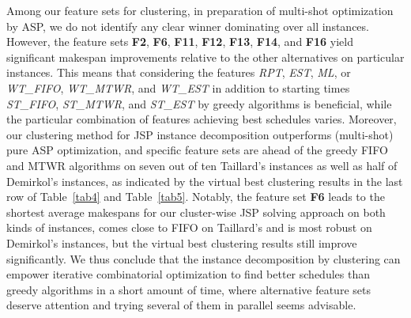 \documentclass[runningheads]{llncs}
\newcommand{\stest}{\textit{ST\_EST}\xspace}
\newcommand{\stmtwr}{\textit{ST\_MTWR}\xspace}
\newcommand{\stfifo}{\textit{ST\_FIFO}\xspace}
\newcommand{\wtest}{\textit{WT\_EST}\xspace}
\newcommand{\wtmtwr}{\textit{WT\_MTWR}\xspace}
\newcommand{\wtfifo}{\textit{WT\_FIFO}\xspace}
\begin{document}
Among our feature sets for clustering, in preparation of multi-shot optimization by ASP,
we do not identify any clear winner dominating over all instances.
However, the feature sets \textbf{F2}, \textbf{F6}, \textbf{F11}, \textbf{F12}, \textbf{F13}, \textbf{F14}, and \textbf{F16}
yield significant makespan improvements relative to the other alternatives on particular instances.
This means that considering the features \textit{RPT}, \textit{EST}, \textit{ML}, or
\wtfifo, \wtmtwr, and \wtest in addition to starting times \stfifo, \stmtwr, and \stest by
greedy algorithms is beneficial, while the particular combination of features achieving best schedules varies.
Moreover, our clustering method for JSP instance decomposition outperforms (multi-shot) pure ASP optimization,
and specific feature sets are ahead of the greedy FIFO and MTWR algorithms on seven out of ten Taillard's instances as well as half of Demirkol's instances,
as indicated by the virtual best clustering results in the last row of Table~\ref{tab4}
and Table~\ref{tab5}.
Notably, the feature set \textbf{F6} leads to the shortest average makespans for
our cluster-wise JSP solving approach on both kinds of instances, comes close to
FIFO on Taillard's and is most robust on Demirkol's instances, but the
virtual best clustering results still improve significantly.
We thus conclude that the instance decomposition by clustering can empower iterative combinatorial optimization
to find better schedules than greedy algorithms in a short amount of time, where alternative feature sets deserve
attention and trying several of them in parallel seems advisable.
\end{document}
